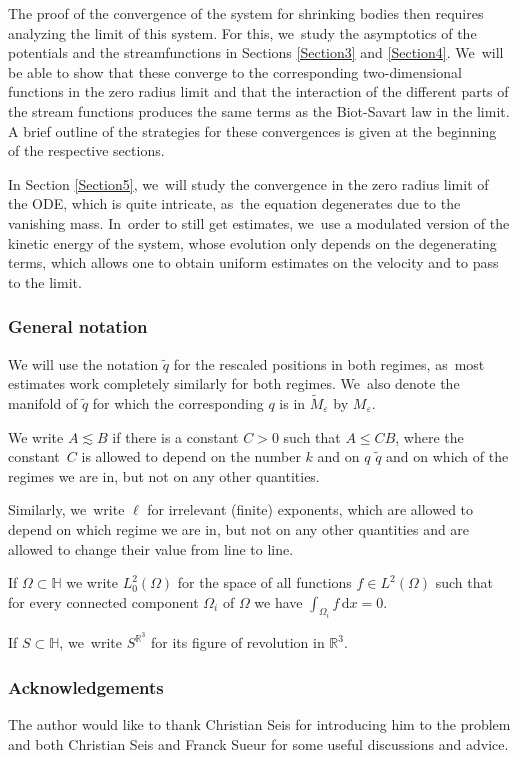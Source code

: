 \documentclass[JEP,XML,SOM,Unicode,published]{cedram}
\let\epsilon\varepsilon
\theoremstyle{definition}
\newcommand\R{\mathbb{R}}
\newcommand\dd{\,\mathrm{d}}
\newcommand\dx{\dd x}
\let\eps\epsilon
\begin{document}
The proof of the convergence of the system for shrinking bodies then requires analyzing the limit of this system. For this, we~study the asymptotics of the potentials and the streamfunctions in Sections \ref{Section3} and \ref{Section4}. We~will be able to show that these converge to the corresponding two-dimensional functions in the zero radius limit and that the interaction of the different parts of the stream functions produces the same terms as the Biot-Savart law in the limit. A brief outline of the strategies for these convergences is given at the beginning of the respective sections.

In Section \ref{Section5}, we~will study the convergence in the zero radius limit of the ODE, which is quite intricate, as~the equation degenerates due to the vanishing mass. In~order to still get estimates, we~use a modulated version of the kinetic energy of the system, whose evolution only depends on the degenerating terms, which allows one to obtain uniform estimates on the velocity and to pass to the limit.

\subsubsection*{General notation}
We will use the notation $\tilde{q}$ for the rescaled positions in both regimes, as~most estimates work completely similarly for both regimes. We~also denote the manifold of $\tilde{q}$ for which the corresponding $q$ is in $\tilde{M}_\eps$ by $M_\eps$.

We write $A\lesssim B$ if there is a constant $C>0$ such that $A\leq CB$, where the constant~$C$ is allowed to depend on the number $k$ and on $q$ \resp $\tilde{q}$ and on which of the regimes we are in, but not on any other quantities.

Similarly, we~write $\ell$ for irrelevant (finite) exponents, which are allowed to depend on which regime we are in, but not on any other quantities and are allowed to change their value from line to line.

If $\Omega\subset \mathbb{H}$ we write $L_0^2(\Omega)$ for the space of all functions $f\in L^2(\Omega)$ such that for every connected component $\Omega_i$ of $\Omega$ we have $\int_{\Omega_i}f\dx=0$.

If $S\subset \mathbb{H}$, we~write $S^{\R^3}$ for its figure of revolution in $\R^3$.

\subsubsection*{Acknowledgements}
The author would like to thank Christian Seis for introducing him to the problem and both Christian Seis and Franck Sueur for some useful discussions and advice.
\end{document}
